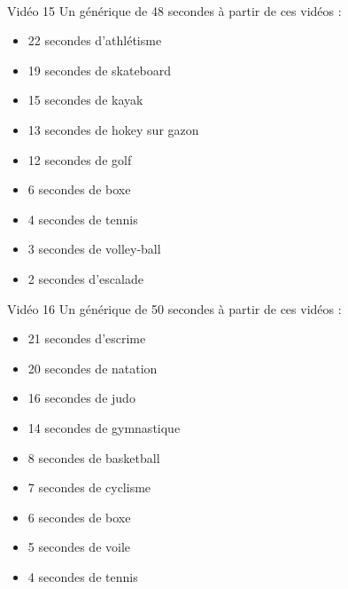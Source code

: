\documentclass[10pt, a5paper,twoside]{article}
\begin{document}
\vfill

\clearpage
~
\vfill

\begin{card}[width = \textwidth, colback = olympicgreen, colframe = olympicgreen, bottomtitle = 2mm]{Vidéo 15}
  Un générique de 48 secondes à partir de ces vidéos :
  \vspace{-1mm}\begin{itemize}
    \item 22 secondes d'athlétisme
    \item 19 secondes de skateboard
    \item 15 secondes de kayak
    \item 13 secondes de hokey sur gazon
    \item 12 secondes de golf
    \item 6 secondes de boxe
    \item 4 secondes de tennis
    \item 3 secondes de volley-ball
    \item 2 secondes d'escalade
  \end{itemize}
\end{card}

\vfill

\begin{card}[width = \textwidth, colback = olympicgreen, colframe = olympicgreen, bottomtitle = 2mm]{Vidéo 16}
  Un générique de 50 secondes à partir de ces vidéos :
  \vspace{-1mm}\begin{itemize}
    \item 21 secondes d'escrime
    \item 20 secondes de natation
    \item 16 secondes de judo
    \item 14 secondes de gymnastique
    \item 8 secondes de basketball
    \item 7 secondes de cyclisme
    \item 6 secondes de boxe
    \item 5 secondes de voile
    \item 4 secondes de tennis
  \end{itemize}
\end{card}

\vfill

\clearpage
~
\vfill
\end{document}
